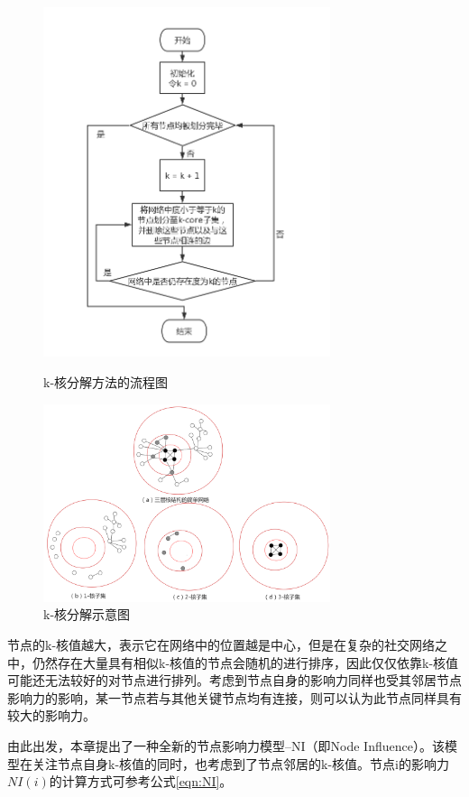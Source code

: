 \begin{figure}
  \centering
  \includegraphics[width=0.75\textwidth]{figures/k-core}
  \caption{k-核分解方法的流程图}\label{fig:k-core}

  \includegraphics[width=0.75\textwidth]{figures/kcoreshili}
  \caption{k-核分解示意图}\label{fig:kcoreshili}
\end{figure}

节点的k-核值越大，表示它在网络中的位置越是中心，但是在复杂的社交网络之中，仍然存在大量具有相似k-核值的节点会随机的进行排序，因此仅仅依靠k-核值可能还无法较好的对节点进行排列。考虑到节点自身的影响力同样也受其邻居节点影响力的影响，某一节点若与其他关键节点均有连接，则可以认为此节点同样具有较大的影响力。

由此出发，本章提出了一种全新的节点影响力模型--NI（即Node Influence）。该模型在关注节点自身k-核值的同时，也考虑到了节点邻居的k-核值。节点i的影响力$NI(i)$的计算方式可参考公式\ref{eqn:NI}。

